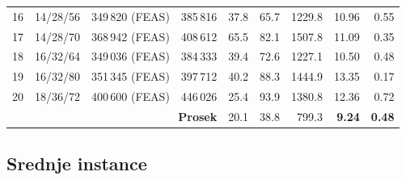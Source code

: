 \documentclass[12pt,a4paper]{article}
\begin{document}
\begin{longtable}{r l r r r r r r r}
16 & 14/28/56 & 349\,820 (FEAS) & 385\,816 & 37.8 & 65.7 & 1229.8 & 10.96 & 0.55 \\
17 & 14/28/70 & 368\,942 (FEAS) & 408\,612 & 65.5 & 82.1 & 1507.8 & 11.09 & 0.35 \\
18 & 16/32/64 & 349\,036 (FEAS) & 384\,333 & 39.4 & 72.6 & 1227.1 & 10.50 & 0.48 \\
19 & 16/32/80 & 351\,345 (FEAS) & 397\,712 & 40.2 & 88.3 & 1444.9 & 13.35 & 0.17 \\
20 & 18/36/72 & 400\,600 (FEAS) & 446\,026 & 25.4 & 93.9 & 1380.8 & 12.36 & 0.72 \\
\midrule
\multicolumn{4}{r}{\textbf{Prosek}} & 20.1 & 38.8 & 799.3 & \textbf{9.24} & \textbf{0.48} \\
\end{longtable}

\subsection{Srednje instance}
\end{document}
